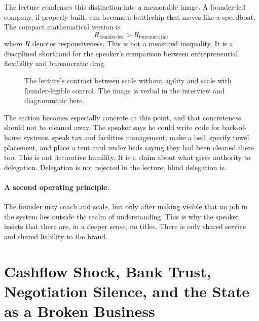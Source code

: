 The lecture condenses this distinction into a memorable image. A founder-led company, if properly built, can become a battleship that moves like a speedboat. The compact mathematical version is
\begin{equation}
R_{\mathrm{founder\text{-}led}} > R_{\mathrm{bureaucratic}},
\end{equation}
where \(R\) denotes responsiveness. This is not a measured inequality. It is a disciplined shorthand for the speaker's comparison between entrepreneurial flexibility and bureaucratic drag.

\begin{figure}[h]
\centering
{}
\caption{The lecture's contrast between scale without agility and scale with founder-legible control. The image is verbal in the interview and diagrammatic here.}
\end{figure}

The section becomes especially concrete at this point, and that concreteness should not be cleaned away. The speaker says he could write code for back-of-house systems, speak tax and facilities management, make a bed, specify towel placement, and place a tent card under beds saying they had been cleaned there too. This is not decorative humility. It is a claim about what gives authority to delegation. Delegation is not rejected in the lecture; blind delegation is.

\paragraph{A second operating principle.}
The founder may coach and scale, but only after making visible that no job in the system lies outside the realm of understanding. This is why the speaker insists that there are, in a deeper sense, no titles. There is only shared service and shared liability to the brand.

\section{Cashflow Shock, Bank Trust, Negotiation Silence, and the State as a Broken Business}

